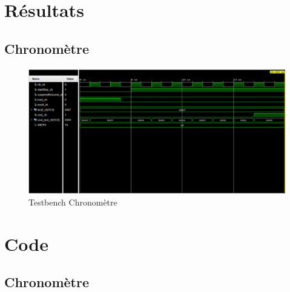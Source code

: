 \documentclass[a4paper,12pt]{report}
\begin{document}
			
	\section{Résultats}
		
		\subsection{Chronomètre}
			\paragraph*{}
			
			\begin{figure}[H]
				\centering
					\includegraphics[scale=0.5]{chrono_tb.png}
					\caption{Testbench Chronomètre}
				\label{chronoTB}
			\end{figure}
			
	
	
	\section{Code}
		\subsection{Chronomètre}
			
		
\end{document}
